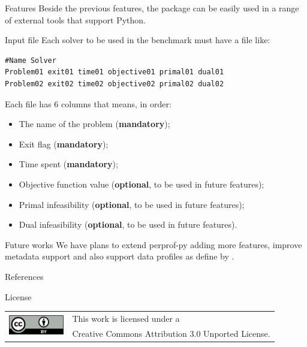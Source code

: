 \documentclass[a0paper,portrait]{baposter}
\begin{document}
\begin{poster}
\begin{posterbox}[column=1]{Features}
    Beside the previous features, the package can be easily used in a range
    of external tools that support Python.
  \end{posterbox}

  \begin{posterbox}[column=1,below=auto]{Input file}
    Each solver to be used in the benchmark must have a file like:

    \begin{lstlisting}
#Name Solver
Problem01 exit01 time01 objective01 primal01 dual01
Problem02 exit02 time02 objective02 primal02 dual02
    \end{lstlisting}

    Each file has 6 columns that means, in order:
    \begin{itemize}
      \item The name of the problem (\textbf{mandatory});
      \item Exit flag (\textbf{mandatory});
      \item Time spent (\textbf{mandatory});
      \item Objective function value (\textbf{optional}, to be used in future
        features);
      \item Primal infeasibility (\textbf{optional}, to be used in future
        features);
      \item Dual infeasibility (\textbf{optional}, to be used in future
        features).
    \end{itemize}
  \end{posterbox}

  \begin{posterbox}[column=1,below=auto]{Future works}
    We have plans to extend perprof-py adding more features, improve metadata
    support and also support data profiles as define by \citeauthor{More2009}.
  \end{posterbox}

  \begin{posterbox}[column=1,below=auto]{References}
    \printbibliography[heading=none]
  \end{posterbox}

  \begin{posterbox}[column=1,below=auto,height=bottom]{License}
    \begin{tabular}{cl}
      \multirow{2}{*}{\includegraphics[height=24pt]{figures/cc-by}} &
      This work is licensed under a \\
      & Creative Commons Attribution 3.0 Unported License.
    \end{tabular}
  \end{posterbox}
\end{poster}
\end{document}
